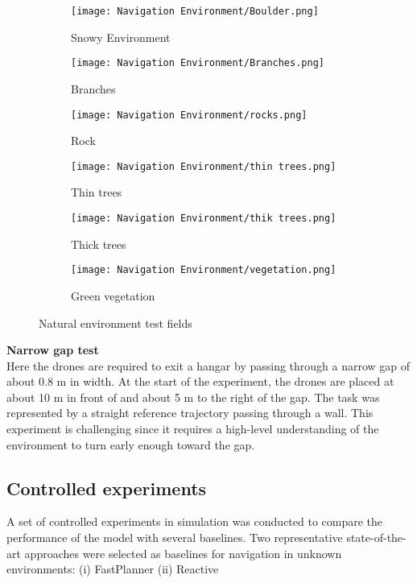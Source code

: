 \begin{figure}[!h]
	\centering
	\begin{subfigure}[b]{0.29\textwidth}
		\centering
		\texttt{[image: Navigation Environment/Boulder.png]}
		\caption{Snowy Environment}
	\end{subfigure}
	\hfill
	\begin{subfigure}[b]{0.29\textwidth}
		\centering
		\texttt{[image: Navigation Environment/Branches.png]}
		\caption{Branches}
	\end{subfigure}
	\hfill	
	\begin{subfigure}[b]{0.29\textwidth}
		\centering
		\texttt{[image: Navigation Environment/rocks.png]}
		\caption{Rock}
	\end{subfigure}
	\hfill
	\begin{subfigure}[b]{0.29\textwidth}
		\centering
		\texttt{[image: Navigation Environment/thin trees.png]}
		\caption{Thin trees}
	\end{subfigure}
	\hfill
	\begin{subfigure}[b]{0.29\textwidth}
		\centering
		\texttt{[image: Navigation Environment/thik trees.png]}
		\caption{Thick trees}
	\end{subfigure}
	\hfill
	\begin{subfigure}[b]{0.29\textwidth}
		\centering
		\texttt{[image: Navigation Environment/vegetation.png]}
		\caption{Green vegetation}
	\end{subfigure}
	
	\caption{Natural environment test fields}
	\label{fig:natural envt}
\end{figure}

\textbf{Narrow gap test}\\
Here the drones are required to exit a hangar by passing through a narrow gap of about 0.8 m in width. At the start of the experiment, the drones are placed at about 10 m in front of and about 5 m to the right of the gap. The task was represented by a straight reference trajectory passing through a wall. This experiment is challenging since it requires a high-level understanding of the environment to turn early enough toward the gap. 

\subsection{Controlled experiments}
A set of controlled experiments in simulation was conducted to compare the performance of the model with several baselines. Two representative state-of-the-art approaches were selected as baselines for navigation in unknown environments: (i) FastPlanner\cite{fastPlanner} (ii) Reactive\cite{reactive_method}

